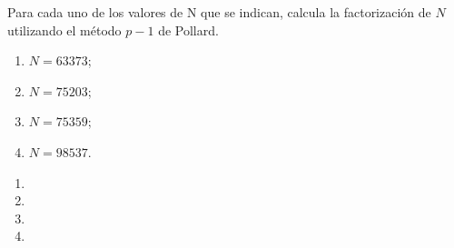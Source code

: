 \documentclass[twoside]{article}
\begin{document}
\newpage

\begin{ejercicio}{2}
Para cada uno de los valores de N que se indican, calcula la factorización de $N$
utilizando el método $p − 1$ de Pollard. 
\begin{enumerate}[1)]
\item $N = 63373$;
\item $N = 75203$;
\item $N = 75359$;
\item $N = 98537$.
\end{enumerate}
\end{ejercicio}
\begin{solucion}
\begin{enumerate}
\item
\item
\item
\item
\end{enumerate}
\end{solucion}

\newpage
\end{document}
